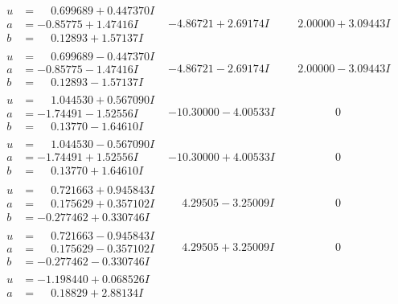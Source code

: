 \documentclass[1p]{elsarticle_modified}
\theoremstyle{definition}
\begin{document}
$$\begin{array}{c|c|c}
\begin{aligned}
u &= \phantom{-}0.699689 + 0.447370 I \\
a &= -0.85775 + 1.47416 I \\
b &= \phantom{-}0.12893 + 1.57137 I\end{aligned}
 & -4.86721 + 2.69174 I & \phantom{-}2.00000 + 3.09443 I \\ \hline\begin{aligned}
u &= \phantom{-}0.699689 - 0.447370 I \\
a &= -0.85775 - 1.47416 I \\
b &= \phantom{-}0.12893 - 1.57137 I\end{aligned}
 & -4.86721 - 2.69174 I & \phantom{-}2.00000 - 3.09443 I \\ \hline\begin{aligned}
u &= \phantom{-}1.044530 + 0.567090 I \\
a &= -1.74491 - 1.52556 I \\
b &= \phantom{-}0.13770 - 1.64610 I\end{aligned}
 & -10.30000 - 4.00533 I & \phantom{-0.000000 } 0 \\ \hline\begin{aligned}
u &= \phantom{-}1.044530 - 0.567090 I \\
a &= -1.74491 + 1.52556 I \\
b &= \phantom{-}0.13770 + 1.64610 I\end{aligned}
 & -10.30000 + 4.00533 I & \phantom{-0.000000 } 0 \\ \hline\begin{aligned}
u &= \phantom{-}0.721663 + 0.945843 I \\
a &= \phantom{-}0.175629 + 0.357102 I \\
b &= -0.277462 + 0.330746 I\end{aligned}
 & \phantom{-}4.29505 - 3.25009 I & \phantom{-0.000000 } 0 \\ \hline\begin{aligned}
u &= \phantom{-}0.721663 - 0.945843 I \\
a &= \phantom{-}0.175629 - 0.357102 I \\
b &= -0.277462 - 0.330746 I\end{aligned}
 & \phantom{-}4.29505 + 3.25009 I & \phantom{-0.000000 } 0 \\ \hline\begin{aligned}
u &= -1.198440 + 0.068526 I \\
a &= \phantom{-}0.18829 + 2.88134 I \\

\end{aligned}
\end{array}$$
\end{document}
